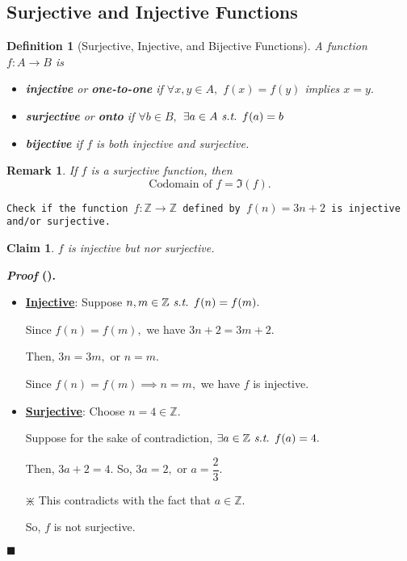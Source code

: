 \documentclass[12pt,a4paper]{article}
\newtheorem{df}{Definition}[subsection]
\newtheorem{clm}{Claim}[subsection]
\newcounter{nprf}[subsection]
\newtheorem*{rmk}{\indent Remark}
\newenvironment*{prf}{\par\indent\textbf{\textit{Proof} (\stepcounter{nprf}\thenprf). }\par }{\par\hfill $\blacksquare$\par}
\def\Z{{\mathbb{Z}}}
\def\st{\emph{ s.t. }}
\begin{document}
\subsection{Surjective and Injective Functions}
\begin{df}[Surjective, Injective, and Bijective Functions]
	A function $f: A\to B$ is 
	\begin{itemize}
		\item \textbf{injective} or \textbf{one-to-one} if $\forall x,y\in A,$ $f(x)=f(y)$ implies $x=y.$
		\item \textbf{surjective} or \textbf{onto} if $\forall b\in B,$ $\exists a\in A\st f(a)=b$
		\item \textbf{bijective} if $f$ is both injective and surjective. 
	\end{itemize}	
\end{df}
\begin{rmk}
	If $f$ is a surjective function, then \[\text{Codomain of }f=\Im(f).\]	
\end{rmk}
\begin{framed}
\noindent\texttt{Check if the function $f:\Z\to\Z$ defined by $f(n)=3n+2$ is injective and/or surjective.}
\begin{clm} $f$ is injective but nor surjective. \end{clm}
\begin{prf}
\begin{itemize}
	\item \textbf{\underline{Injective}}: Suppose $n,m\in\Z\st f(n)=f(m).$\par Since $f(n)=f(m),$ we have $3n+2=3m+2.$\par Then, $3n=3m,$ or $n=m.$\par Since $f(n)=f(m)\implies n=m,$ we have $f$ is injective. 
	\item \textbf{\underline{Surjective}}: Choose $n=4\in\Z.$\par Suppose for the sake of contradiction, $\exists a\in\Z\st f(a)=4.$\par Then, $3a+2=4.$ So, $3a=2,$ or $a=\dfrac{2}{3}.$\par \begin{center}$\divideontimes$ This contradicts with the fact that $a\in\Z.$\end{center}\par So, $f$ is not surjective. 
\end{itemize}	
\end{prf}
\end{framed}
\end{document}
